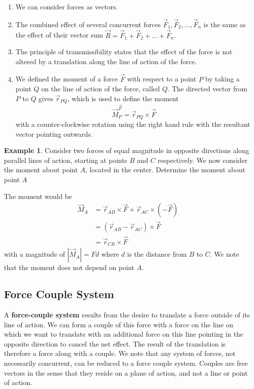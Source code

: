 \documentclass[11pt]{article}
\theoremstyle{plain} %
\theoremstyle{definition}
\theoremstyle{example}
\newtheorem*{example}{Example}
\theoremstyle{remark}
\begin{document}
\begin{enumerate}
	\item We can consider forces as vectors. 
	\item The combined effect of several concurrent forces $\vec{F}_1, \vec{F}_2, ...,\vec{F}_n$ is the same as the effect of their vector sum $\vec{R} = \vec{F}_1 + \vec{F}_2 + ...+\vec{F}_n$. 
	\item The principle of transmissibility states that the effect of the force is not altered by a translation along the line of action of the force. 
	\item We defined the moment of a force $\vec{F}$ with respect to a point $P$ by taking a point $Q$ on the line of action of the force, called $Q$. The directed vector from $P$ to $Q$ gives $\vec{r}_{PQ}$, which is used to define the moment $$\vec{M}_P^{\vec{F}} = \vec{r}_{PQ} \times \vec{F}$$ with a counter-clockwise rotation using the right hand rule with the resultant vector pointing outwards. 
\end{enumerate}

\begin{example}
Consider two forces of equal magnitude in opposite directions along parallel lines of action, starting at points $B$ and $C$ respectively. We now consider the moment about point $A$, located in the center. Determine the moment about point $A$
\end{example}

The moment would be 
\begin{align*}
	\vec{M}_A &= \vec{r}_{AB} \times \vec{F} + \vec{r}_{AC} \times \left(-\vec{F}\right) \\
	&=\left(\vec{r}_{AB} - \vec{r}_{AC}\right) \times \vec{F}\\
	&= \vec{r}_{CB} \times \vec{F}
\end{align*}
with a magnitude of $\left|\vec{M}_A\right| = Fd$ where $d$ is the distance from $B$ to $C$. We note that the moment does not depend on point $A$. 

\subsection{Force Couple System}

A \textbf{force-couple system} results from the desire to translate a force outside of its line of action. We can form a couple of this force with a force on the line on which we want to translate with an additional force on this line pointing in the opposite direction to cancel the net effect. The result of the translation is therefore a force along with a couple. We note that any system of forces, not necessarily concurrent, can be reduced to a force couple system. Couples are free vectors in the sense that they reside on a plane of action, and not a line or point of action. 
\end{document}
